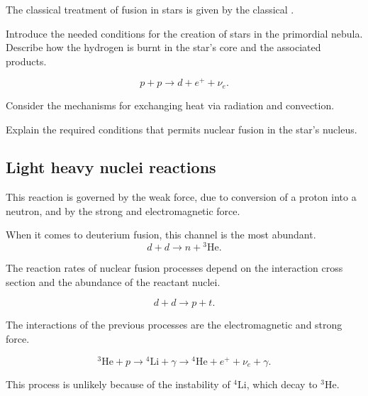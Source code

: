 \documentclass[openany]{book}
\begin{document}
The classical treatment of fusion in stars is given by the classical \cite{burbidge_burbidge_fowler_hoyle_1957}.

Introduce the needed conditions for the creation of stars in the primordial nebula.
Describe how the hydrogen is burnt in the star's core and the associated products. 

\begin{equation} \label{eq:reaction_ppMain}
	p + p \rightarrow d + e^{+} + \nu_e.
\end{equation}

Consider the mechanisms for exchanging heat via radiation and convection.

Explain the required conditions that permits nuclear fusion in the star's nucleus.

\subsection{Light heavy nuclei reactions} \label{sub:lightReactions}

This reaction is governed by the weak force, due to conversion of a proton into a neutron, and by the strong and electromagnetic force.

When it comes to deuterium fusion, this channel is the most abundant.\\

\begin{equation} \label{eq:reaction_2Hdn3He}
	d + d  \rightarrow n + {}^{3}\mathrm{He}.
\end{equation}

The reaction rates of nuclear fusion processes depend on the interaction cross section and the abundance of the reactant nuclei.

\begin{equation}  \label{eq:reaction_2Hdpt}
	d + d \rightarrow p + t.
\end{equation}

The interactions of the previous processes are the electromagnetic and strong force.

\begin{equation} \label{eq:reaction_3HepChain}
	{}^{3}\mathrm{He} + p \rightarrow {}^{4}\mathrm{Li} + \gamma \rightarrow {}^{4}\mathrm{He} + e^{+} +  \nu_e + \gamma.
\end{equation}

This process is unlikely because of the instability of  ${}^{4}\mathrm{Li}$, which decay to ${}^{3}\mathrm{He}$.
\end{document}

